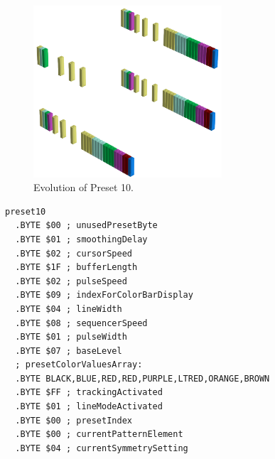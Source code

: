 \vspace*{-0.7cm}
\begin{minipage}[b]{0.48\linewidth}


                                                                 
\begin{figure}[H]                                                          
  \centering                                                             
  \begin{adjustbox}{width=7cm,center}                                   
  \includegraphics[width=7cm]{src/presets/pattern10-45.png}%
  \end{adjustbox}                                                        
\caption{Evolution of Preset 10.}                                           
\end{figure}                                                               
                                                                 
                                                                           
\end{minipage}
\hspace{0.1cm}
\begin{minipage}[b]{0.48\linewidth}                                       
\begin{lstlisting}[basicstyle=\ttfamily\scriptsize,caption=Data structure for Preset 10.]
preset10
  .BYTE $00 ; unusedPresetByte
  .BYTE $01 ; smoothingDelay
  .BYTE $02 ; cursorSpeed
  .BYTE $1F ; bufferLength
  .BYTE $02 ; pulseSpeed
  .BYTE $09 ; indexForColorBarDisplay
  .BYTE $04 ; lineWidth
  .BYTE $08 ; sequencerSpeed
  .BYTE $01 ; pulseWidth
  .BYTE $07 ; baseLevel
  ; presetColorValuesArray: 
  .BYTE BLACK,BLUE,RED,RED,PURPLE,LTRED,ORANGE,BROWN
  .BYTE $FF ; trackingActivated
  .BYTE $01 ; lineModeActivated
  .BYTE $00 ; presetIndex
  .BYTE $00 ; currentPatternElement
  .BYTE $04 ; currentSymmetrySetting
\end{lstlisting}
\end{minipage}

